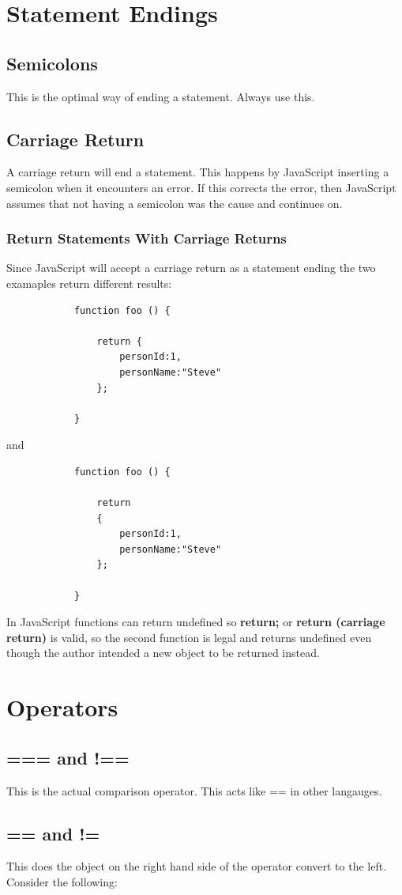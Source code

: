 \documentclass {amsart}
\begin{document}
\section{Statement Endings}
	\subsection{Semicolons}
		This is the optimal way of ending a statement.  Always use this.
	\subsection {Carriage Return}
		A carriage return will end a statement.  This happens by JavaScript inserting a semicolon when it encounters an error.  If this corrects the error, then JavaScript assumes that not having a semicolon was the cause and continues on. 
	\subsubsection {Return Statements With Carriage Returns}
		Since JavaScript will accept a carriage return as a statement ending the two examaples return different results: 
		\begin{lstlisting}
			function foo () {

				return {
					personId:1,
					personName:"Steve"
				};

			}
		\end{lstlisting}
		and
		\begin{lstlisting}
			function foo () {

				return 
				{
					personId:1,
					personName:"Steve"
				};

			}
		\end{lstlisting}
	In JavaScript functions can return undefined so {\bf return;} or {\bf return (carriage return)} is valid, so the second function is legal and returns undefined even though the author intended a new object to be returned instead.

		
\section{Operators}
	\subsection{=== and !==}
		This is the actual comparison operator.  This acts like == in other langauges.
	\subsection{== and !=}
		This does the object on the right hand side of the operator convert to the left.  
		Consider the following: 
\end{document}
